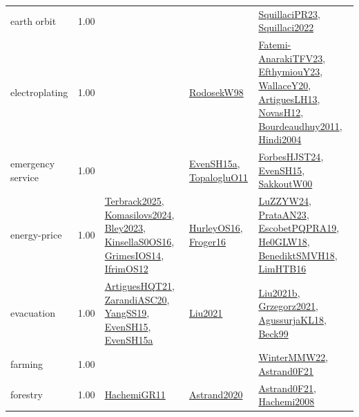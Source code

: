 {\begin{longtable}{p{3cm}r>{\raggedright\arraybackslash}p{6cm}>{\raggedright\arraybackslash}p{6cm}>{\raggedright\arraybackslash}p{8cm}}
\index{earth orbit}\index{ApplicationAreas!earth orbit}earth orbit &  1.00 &  &  & \hyperref[detail:SquillaciPR23]{SquillaciPR23}, \hyperref[detail:Squillaci2022]{Squillaci2022}\\
\index{electroplating}\index{ApplicationAreas!electroplating}electroplating &  1.00 &  & \hyperref[detail:RodosekW98]{RodosekW98} & \hyperref[detail:Fatemi-AnarakiTFV23]{Fatemi-AnarakiTFV23}, \hyperref[detail:EfthymiouY23]{EfthymiouY23}, \hyperref[detail:WallaceY20]{WallaceY20}, \hyperref[detail:ArtiguesLH13]{ArtiguesLH13}, \hyperref[detail:NovasH12]{NovasH12}, \hyperref[detail:Bourdeaudhuy2011]{Bourdeaudhuy2011}, \hyperref[detail:Hindi2004]{Hindi2004}\\
\index{emergency service}\index{ApplicationAreas!emergency service}emergency service &  1.00 &  & \hyperref[detail:EvenSH15a]{EvenSH15a}, \hyperref[detail:TopalogluO11]{TopalogluO11} & \hyperref[detail:ForbesHJST24]{ForbesHJST24}, \hyperref[detail:EvenSH15]{EvenSH15}, \hyperref[detail:SakkoutW00]{SakkoutW00}\\
\index{energy-price}\index{ApplicationAreas!energy-price}energy-price &  1.00 & \hyperref[detail:Terbrack2025]{Terbrack2025}, \hyperref[detail:Komasilovs2024]{Komasilovs2024}, \hyperref[detail:Bley2023]{Bley2023}, \hyperref[detail:KinsellaS0OS16]{KinsellaS0OS16}, \hyperref[detail:GrimesIOS14]{GrimesIOS14}, \hyperref[detail:IfrimOS12]{IfrimOS12} & \hyperref[detail:HurleyOS16]{HurleyOS16}, \hyperref[detail:Froger16]{Froger16} & \hyperref[detail:LuZZYW24]{LuZZYW24}, \hyperref[detail:PrataAN23]{PrataAN23}, \hyperref[detail:EscobetPQPRA19]{EscobetPQPRA19}, \hyperref[detail:He0GLW18]{He0GLW18}, \hyperref[detail:BenediktSMVH18]{BenediktSMVH18}, \hyperref[detail:LimHTB16]{LimHTB16}\\
\index{evacuation}\index{ApplicationAreas!evacuation}evacuation &  1.00 & \hyperref[detail:ArtiguesHQT21]{ArtiguesHQT21}, \hyperref[detail:ZarandiASC20]{ZarandiASC20}, \hyperref[detail:YangSS19]{YangSS19}, \hyperref[detail:EvenSH15]{EvenSH15}, \hyperref[detail:EvenSH15a]{EvenSH15a} & \hyperref[detail:Liu2021]{Liu2021} & \hyperref[detail:Liu2021b]{Liu2021b}, \hyperref[detail:Grzegorz2021]{Grzegorz2021}, \hyperref[detail:AgussurjaKL18]{AgussurjaKL18}, \hyperref[detail:Beck99]{Beck99}\\
\index{farming}\index{ApplicationAreas!farming}farming &  1.00 &  &  & \hyperref[detail:WinterMMW22]{WinterMMW22}, \hyperref[detail:Astrand0F21]{Astrand0F21}\\
\index{forestry}\index{ApplicationAreas!forestry}forestry &  1.00 & \hyperref[detail:HachemiGR11]{HachemiGR11} & \hyperref[detail:Astrand2020]{Astrand2020} & \hyperref[detail:Astrand0F21]{Astrand0F21}, \hyperref[detail:Hachemi2008]{Hachemi2008}\\

\end{longtable}}
